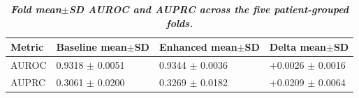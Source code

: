 \begin{table}[!t]
\centering
\caption{\textbf{\textit{Fold mean$\pm$SD AUROC and AUPRC across the five patient-grouped folds.}}}
\label{tab:phase10_fold_summary}
\scriptsize
\renewcommand{\arraystretch}{1.12}
\begin{tabular}{llll}
\toprule
\textbf{Metric} & \textbf{Baseline mean$\pm$SD} & \textbf{Enhanced mean$\pm$SD} & \textbf{Delta mean$\pm$SD} \\
\midrule
AUROC & 0.9318 $\pm$ 0.0051 & 0.9344 $\pm$ 0.0036 & +0.0026 $\pm$ 0.0016 \\
AUPRC & 0.3061 $\pm$ 0.0200 & 0.3269 $\pm$ 0.0182 & +0.0209 $\pm$ 0.0064 \\
\bottomrule
\end{tabular}
\end{table}
